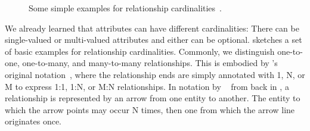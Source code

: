 %
%
%
\begin{figure}%
%
%
%
\floatSep%
%
%
%
\floatSep%
%
%
%
\caption{Some simple examples for relationship cardinalities~\cite{SS2005EIDDDFDB:CDDICAMP,V1999C5DMS:CDUTERM}.}%
\label{fig:relationshipCardinalities}%
%
\end{figure}%
%
We already learned that attributes can have different cardinalities:
There can be single-valued or multi-valued attributes and either can be optional.
 sketches a set of basic examples for relationship cardinalities.
Commonly, we distinguish one-to-one, one-to-many, and many-to-many relationships.
This is embodied by \citeauthor{C1976TERMTAUVOD}'s original  notation~\cite{C1976TERMTAUVOD}, where the relationship ends are simply annotated with 1, N, or M to express 1:1, 1:N, or M:N relationships.
In notation by \citeauthor{B1969DSD}~\cite{B1969DSD} from back in \citeyear{B1969DSD}, a relationship is represented by an arrow from one entity to another.
The entity to which the arrow points may occur N times, then one from which the arrow line originates once.

